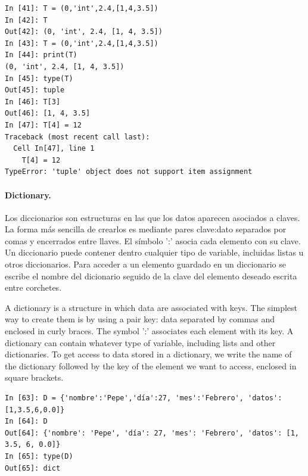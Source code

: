 \begin{center}
\begin{minipage}{0.4\textwidth}
\begin{verbatim}
In [41]: T = (0,'int',2.4,[1,4,3.5])
In [42]: T
Out[42]: (0, 'int', 2.4, [1, 4, 3.5])
In [43]: T = (0,'int',2.4,[1,4,3.5])
In [44]: print(T)
(0, 'int', 2.4, [1, 4, 3.5])
In [45]: type(T)
Out[45]: tuple
In [46]: T[3]
Out[46]: [1, 4, 3.5]
In [47]: T[4] = 12
Traceback (most recent call last):
  Cell In[47], line 1
    T[4] = 12
TypeError: 'tuple' object does not support item assignment

\end{verbatim}
\end{minipage}
\end{center}

\begin{paracol}{2}
\paragraph{Dictionary.} Los diccionarios son estructuras en las que los datos aparecen asociados a claves. La forma más sencilla de crearlos es mediante pares clave:dato separados por comas y encerrados entre llaves. El símbolo ':' asocia cada elemento con su clave. Un diccionario puede contener dentro cualquier tipo de variable, incluidas listas u otros diccionarios. Para acceder a un elemento guardado en un diccionario se escribe el nombre del dicionario seguido de la clave del elemento deseado escrita entre corchetes.

\switchcolumn
A dictionary is a structure in which data are associated with keys. The simplest way to create them is by using a pair key: data separated by commas and enclosed in curly braces. The symbol ':' associates each element with its key. A dictionary can contain whatever type of variable, including lists and other dictionaries. To get access to data stored in a dictionary, we write the name of the dictionary followed by the key of the element we want to access, enclosed in square brackets.
\end{paracol}


\begin{verbatim}
In [63]: D = {'nombre':'Pepe','día':27, 'mes':'Febrero', 'datos':[1,3.5,6,0.0]}
In [64]: D
Out[64]: {'nombre': 'Pepe', 'día': 27, 'mes': 'Febrero', 'datos': [1, 3.5, 6, 0.0]}
In [65]: type(D)
Out[65]: dict
\end{verbatim}        



